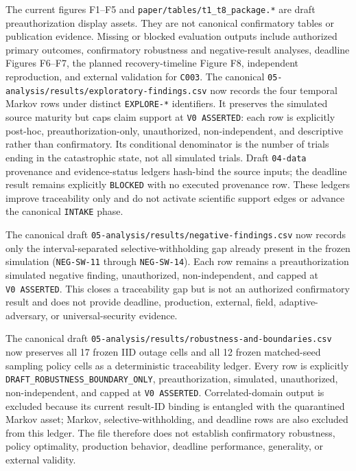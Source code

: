 \documentclass[
]{article}
\begin{document}
The current figures F1--F5 and \texttt{paper/tables/t1\_t8\_package.*}
are draft preauthorization display assets. They are not canonical
confirmatory tables or publication evidence. Missing or blocked
evaluation outputs include authorized primary outcomes, confirmatory
robustness and negative-result analyses, deadline Figures F6--F7, the
planned recovery-timeline Figure F8, independent reproduction, and
external validation for \texttt{C003}. The canonical
\texttt{05-analysis/results/exploratory-findings.csv} now records the
four temporal Markov rows under distinct \texttt{EXPLORE-*} identifiers.
It preserves the simulated source maturity but caps claim support at
\texttt{V0\ ASSERTED}: each row is explicitly post-hoc,
preauthorization-only, unauthorized, non-independent, and descriptive
rather than confirmatory. Its conditional denominator is the number of
trials ending in the catastrophic state, not all simulated trials. Draft
\texttt{04-data} provenance and evidence-status ledgers hash-bind the
source inputs; the deadline result remains explicitly \texttt{BLOCKED}
with no executed provenance row. These ledgers improve traceability only
and do not activate scientific support edges or advance the canonical
\texttt{INTAKE} phase.

The canonical draft \texttt{05-analysis/results/negative-findings.csv}
now records only the interval-separated selective-withholding gap
already present in the frozen simulation (\texttt{NEG-SW-11} through
\texttt{NEG-SW-14}). Each row remains a preauthorization simulated
negative finding, unauthorized, non-independent, and capped at
\texttt{V0\ ASSERTED}. This closes a traceability gap but is not an
authorized confirmatory result and does not provide deadline,
production, external, field, adaptive-adversary, or universal-security
evidence.

The canonical draft
\texttt{05-analysis/results/robustness-and-boundaries.csv} now preserves
all 17 frozen IID outage cells and all 12 frozen matched-seed sampling
policy cells as a deterministic traceability ledger. Every row is
explicitly \texttt{DRAFT\_ROBUSTNESS\_BOUNDARY\_ONLY}, preauthorization,
simulated, unauthorized, non-independent, and capped at
\texttt{V0\ ASSERTED}. Correlated-domain output is excluded because its
current result-ID binding is entangled with the quarantined Markov
asset; Markov, selective-withholding, and deadline rows are also
excluded from this ledger. The file therefore does not establish
confirmatory robustness, policy optimality, production behavior,
deadline performance, generality, or external validity.
\end{document}
